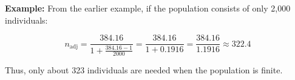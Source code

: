 \documentclass[twoside]{book}
\begin{document}
\textbf{Example:} From the earlier example, if the population consists of only 2,000 individuals:

\[
n_{\text{adj}} = \frac{384.16}{1 + \frac{384.16 - 1}{2000}} = \frac{384.16}{1 + 0.1916} = \frac{384.16}{1.1916} \approx 322.4
\]

Thus, only about 323 individuals are needed when the population is finite.







\end{document}
